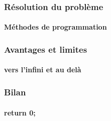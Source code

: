 \documentclass{beamer}
\begin{document}
    \begin{frame}
    \frametitle{Résolution du problème}
    \framesubtitle{Méthodes de programmation}
    \end{frame}


    \begin{frame}
    \frametitle{Avantages et limites}
    \framesubtitle{vers l'infini et au delà}
    \end{frame}


    \begin{frame}
    \frametitle{Bilan}
    \framesubtitle{return 0;}
    \end{frame}



\end{document}
